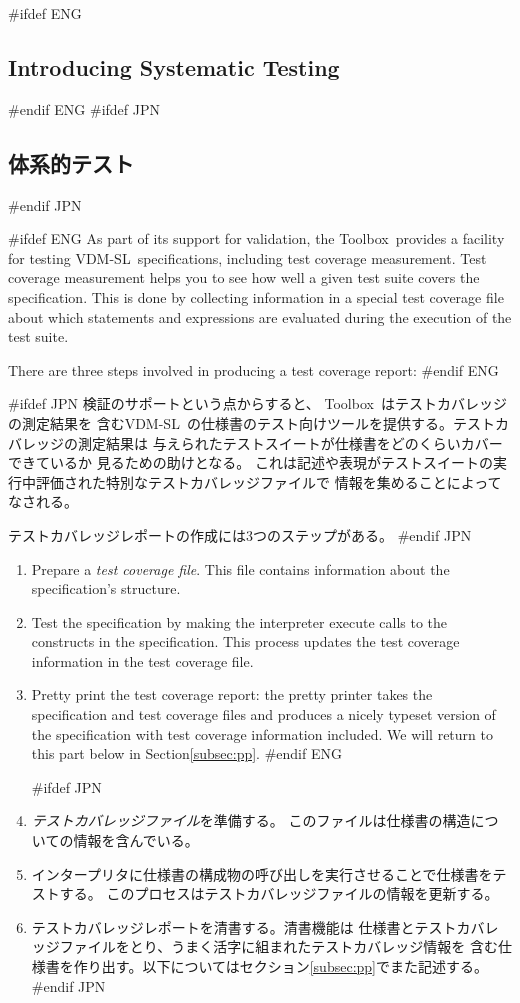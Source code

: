 \documentclass[\pformat,12pt]{article}
\newcommand{\vdmslpp}{VDM-SL}
\newcommand{\Toolbox}{Toolbox}
\newcommand{\vdmslpp}{VDM++}
\newcommand{\Toolbox}{Toolbox}
\begin{document}
#ifdef ENG
\subsection{Introducing Systematic Testing}
#endif ENG
#ifdef JPN
\subsection{体系的テスト}
#endif JPN
\label{tour:testing}

#ifdef ENG
As part of its support for validation, the \Toolbox\ provides a
facility for testing \vdmslpp\ specifications, including test
  coverage measurement.  Test coverage measurement helps you to see
how well a given test suite covers the
specification. This is done by collecting information in a special
test coverage file about which statements and expressions are
evaluated during the execution of the test suite.

There are three steps involved in producing a test coverage report:
#endif ENG

#ifdef JPN
検証のサポートという点からすると、 \Toolbox\ はテストカバレッジの測定結果を
含む\vdmslpp\ の仕様書のテスト向けツールを提供する。テストカバレッジの測定結果は
与えられたテストスイートが仕様書をどのくらいカバーできているか
見るための助けとなる。
これは記述や表現がテストスイートの実行中評価された特別なテストカバレッジファイルで
情報を集めることによってなされる。

テストカバレッジレポートの作成には3つのステップがある。
#endif JPN

\begin{enumerate}
#ifdef ENG
\item
Prepare a {\em test coverage file}. This file contains
  information about the specification's structure. 
\item Test the specification by making the interpreter execute calls
to the constructs in the specification. This process updates the test
coverage information in the test coverage file.
\item Pretty print the test coverage report: the pretty printer takes
  the specification and test coverage files and produces a nicely typeset
  version of the specification with test coverage information
  included. We will return to this part below in Section\ref{subsec:pp}.
#endif ENG

#ifdef JPN
\item
{\em テストカバレッジファイル}を準備する。
このファイルは仕様書の構造についての情報を含んでいる。

\item
インタープリタに仕様書の構成物の呼び出しを実行させることで仕様書をテストする。
このプロセスはテストカバレッジファイルの情報を更新する。

\item
テストカバレッジレポートを清書する。清書機能は
仕様書とテストカバレッジファイルをとり、うまく活字に組まれたテストカバレッジ情報を
含む仕様書を作り出す。以下についてはセクション\ref{subsec:pp}でまた記述する。
#endif JPN
\end{enumerate}
\end{document}

